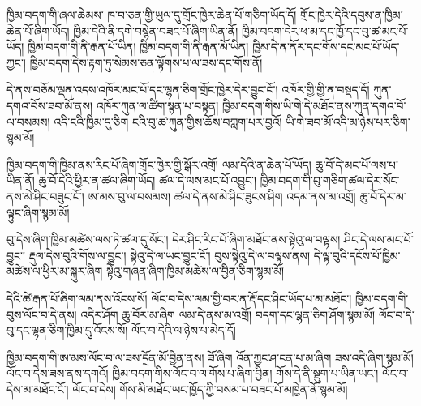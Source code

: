 \documentclass[12pt]{nextbook}
\begin{document}
\begin{readersection}{ཁྱིམ་བདག་གི་ཞལ་ཆེམས་}
ཁ་བ་ཅན་གྱི་ཡུལ་དུ་གྲོང་ཁྱེར་ཆེན་པོ་གཅིག་ཡོད་དོ། གྲོང་ཁྱེར་དེའི་དབུས་ན་ཁྱིམ་ཆེན་པོ་ཞིག་ཡོད། ཁྱིམ་དེའི་ནི་དགེ་བསྙེན་བཟང་པོ་ཞིག་ཡིན་ནོ། ཁྱིམ་བདག་དེར་ཕ་མ་དང་ཁྱོ་དང་བུ་ཚ་མང་པོ་ཡོད། ཁྱིམ་བདག་གི་ནི་རྒན་པོ་ཡིན། ཁྱིམ་བདག་གི་ནི་རྒན་མོ་ཡིན། ཁྱིམ་དེ་ན་ནོར་དང་གོས་དང་མང་པོ་ཡོད་ཀྱང་། ཁྱིམ་བདག་དེས་རྟག་ཏུ་སེམས་ཅན་ལྟོགས་པ་ལ་ཟས་དང་གོས་ནོ།

དེ་ནས་བཅོམ་ལྡན་འདས་འཁོར་མང་པོ་དང་ལྷན་ཅིག་གྲོང་ཁྱེར་དེར་བྱུང་ངོ་། འཁོར་གྱི་གྱི་ན་བསྡད་དོ། ཀུན་དགའ་བོས་ཟབ་མོ་ནས། འཁོར་ཀུན་ལ་ཚིག་སྙན་པ་བསྟན། ཁྱིམ་བདག་གིས་ཡི་གེ་དེ་མཐོང་ནས་ཀུན་དགའ་བོ་ལ་བསམས། འདི་ངའི་ཁྱིམ་དུ་ཅིག ངའི་བུ་ཚ་ཀུན་གྱིས་ཆོས་བཀླག་པར་བྱའོ། ཡི་གེ་ཟབ་མོ་འདི་མ་ཉེས་པར་ཅིག་སྙམ་མོ།

ཁྱིམ་བདག་གི་ཁྱིམ་ནས་རིང་པོ་ཞིག་གྲོང་ཁྱེར་གྱི་སྒོར་འགྲོ། ལམ་དེའི་ན་ཆེན་པོ་ཡོད། ཆུ་བོ་དེ་མང་པོ་ལས་པ་ཡིན་ནོ། ཆུ་བོ་དེའི་ཕྱིར་ན་ཚལ་ཞིག་ཡོད། ཚལ་དེ་ལས་མང་པོ་འབྱུང་། ཁྱིམ་བདག་གི་བུ་གཅིག་ཚལ་དེར་སོང་ནས་མེ་ཤིང་བཟུང་ངོ་། ཨ་མས་བུ་ལ་བསམས། ཚལ་དེ་ནས་མེ་ཤིང་ཟུངས་ཤིག འདམ་ནས་མ་འགྲོ། ཆུ་བོ་དེར་མ་ལྟུང་ཞིག་སྙམ་མོ།

བུ་དེས་ཞིག་ཁྱིམ་མཚེས་ལས་ཏེ་ཚལ་དུ་སོང་། དེར་ཤིང་རིང་པོ་ཞིག་མཐོང་ནས་སྟེའུ་ལ་བལྟས། ཤིང་དེ་ལས་མང་པོ་བྱུང་། རྡུལ་དེས་བུའི་གོས་ལ་བྱུང་། སྟེའུ་དེ་ལ་ཡང་བྱུང་ངོ་། བུས་སྟེའུ་དེ་ལ་བལྟས་ནས། དེ་ལྟ་བུའི་དངོས་པོ་ཁྱིམ་མཚེས་ལ་ཕྱིར་མ་སྐུར་ཞིག སྟེའུ་གཞན་ཞིག་ཁྱིམ་མཚེས་ལ་བྱིན་ཅིག་སྙམ་མོ།

དེའི་ཚེ་རྒན་པོ་ཞིག་ལམ་ནས་འོངས་སོ། ལོང་བ་དེས་ལམ་གྱི་བར་ན་རྡོ་དང་ཤིང་ཡོད་པ་མ་མཐོང་། ཁྱིམ་བདག་གི་བུས་ལོང་བ་དེ་ནས། འདིར་ཤོག ཆུ་བོར་མ་ཞིག ལམ་དེ་ནས་མ་འགྲོ། བདག་དང་ལྷན་ཅིག་ཤོག་སྙམ་མོ། ལོང་བ་དེ་བུ་དང་ལྷན་ཅིག་ཁྱིམ་དུ་འོངས་སོ། ལོང་བ་དེའི་ལ་ཉེས་པ་མེད་དོ།

ཁྱིམ་བདག་གི་ཨ་མས་ལོང་བ་ལ་ཟས་དྲོན་མོ་བྱིན་ནས། ཟོ་ཞིག འོན་ཀྱང་ཤ་ངན་པ་མ་ཞིག ཟས་འདི་ཞིག་སྙམ་མོ། ལོང་བ་དེས་ཟས་ནས་དགའོ། ཁྱིམ་བདག་གིས་ལོང་བ་ལ་གོས་པ་ཞིག་བྱིན། གོས་དེ་ནི་སྡུག་པ་ཡིན་ཡང་། ལོང་བ་དེས་མ་མཐོང་ངོ་། ལོང་བ་དེས། གོས་མི་མཐོང་ཡང་ཁྱོད་ཀྱི་བསམ་པ་བཟང་པོ་མཁྱེན་ནོ་སྙམ་མོ།


\end{readersection}
\end{document}
